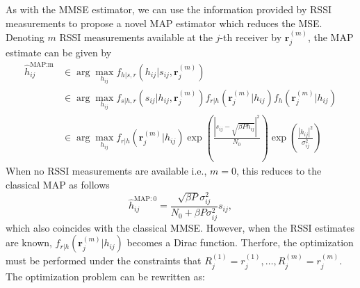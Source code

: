 \documentclass[francais]{gretsi}
\begin{document}
As with the MMSE estimator, we can use the information provided by RSSI measurements to propose a novel MAP estimator which reduces the MSE. Denoting $m$ RSSI measurements available at the $j$-th receiver by $\mathbf{r}_j^{(m)}$, the MAP estimate can be given by
{\footnotesize \begin{equation}
\begin{split}
\widehat{h}_{ij}^{\text{MAP:m}}&\in \arg \max_{h_{ij}} f_{h|s,r}(h_{ij}|{s}_{ij} ,\mathbf{r}_j^{(m)} )\\
&\in \arg \max_{h_{ij}} f_{s|h,r}(s_{ij}|h_{ij},\mathbf{r}_j^{(m)} )f_{r|h}(\mathbf{r}_j^{(m)}|h_{ij} )f_{h}(\mathbf{r}_j^{(m)}|h_{ij} )\\
&\in \arg \max_{h_{ij}} f_{r|h}(\mathbf{r}_j^{(m)}|h_{ij} )\exp(\frac{|s_{ij}-\sqrt{\beta P h_{ij}}|^2}{N_0})\exp(\frac{|h_{ij}|^2}{\sigma_{ij}^2})
\end{split}
\label{eq:newbasicmap}
\end{equation}}
When no RSSI measurements are available i.e., $m=0$, this reduces to the classical MAP as follows 
\begin{equation}
\widehat{h}_{ij}^{\text{MAP}:0} = \frac{\sqrt{\beta P}\sigma_{ij}^2}{N_0+ \beta P\sigma_{ij}^2 } s_{ij},
\label{eq:MAP_conventional}
\end{equation}
which also coincides with the classical MMSE. However, when the RSSI estimates are known, $f_{r|h}(\mathbf{r}_j^{(m)}|h_{ij} )$ becomes a Dirac function. Therfore, the optimization must be performed under the constraints that $R_{j}^{(1)}=r_{j}^{(1)},\dots,R_{j}^{(m)}=r_{j}^{(m)}$. The optimization problem can be rewritten as:
\end{document}
